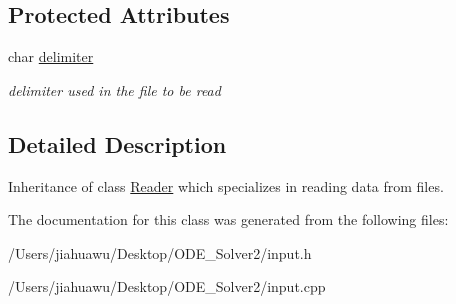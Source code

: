 \subsection*{Protected Attributes}
\begin{DoxyCompactItemize}
\item 
\mbox{\label{class_data___reader_ac05700473d754089d7f30d2cc7dccce9}} 
char \mbox{\hyperlink{class_data___reader_ac05700473d754089d7f30d2cc7dccce9}{delimiter}}
\begin{DoxyCompactList}\small\item\em delimiter used in the file to be read \end{DoxyCompactList}\end{DoxyCompactItemize}


\subsection{Detailed Description}
Inheritance of class \mbox{\hyperlink{class_reader}{Reader}} which specializes in reading data from files. 

The documentation for this class was generated from the following files\+:\begin{DoxyCompactItemize}
\item 
/\+Users/jiahuawu/\+Desktop/\+O\+D\+E\+\_\+\+Solver2/input.\+h\item 
/\+Users/jiahuawu/\+Desktop/\+O\+D\+E\+\_\+\+Solver2/input.\+cpp\end{DoxyCompactItemize}
